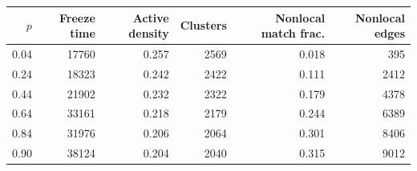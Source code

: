 \begin{tabular}{rrrrrr}
\toprule
$p$ & Freeze time & Active density & Clusters & Nonlocal match frac. & Nonlocal edges \\
\midrule
0.04 & 17760 & 0.257 & 2569 & 0.018 & 395 \\
0.24 & 18323 & 0.242 & 2422 & 0.111 & 2412 \\
0.44 & 21902 & 0.232 & 2322 & 0.179 & 4378 \\
0.64 & 33161 & 0.218 & 2179 & 0.244 & 6389 \\
0.84 & 31976 & 0.206 & 2064 & 0.301 & 8406 \\
0.90 & 38124 & 0.204 & 2040 & 0.315 & 9012 \\
\bottomrule
\end{tabular}
